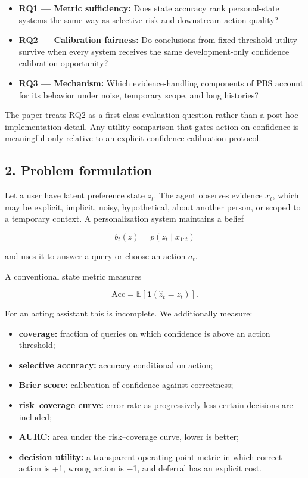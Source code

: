 \begin{itemize}
\tightlist
\item
  \textbf{RQ1 --- Metric sufficiency:} Does state accuracy rank
  personal-state systems the same way as selective risk and downstream
  action quality?
\item
  \textbf{RQ2 --- Calibration fairness:} Do conclusions from
  fixed-threshold utility survive when every system receives the same
  development-only confidence calibration opportunity?
\item
  \textbf{RQ3 --- Mechanism:} Which evidence-handling components of PBS
  account for its behavior under noise, temporary scope, and long
  histories?
\end{itemize}

The paper treats RQ2 as a first-class evaluation question rather than a
post-hoc implementation detail. Any utility comparison that gates action
on confidence is meaningful only relative to an explicit confidence
calibration protocol.

\subsection{2. Problem formulation}\label{problem-formulation}

Let a user have latent preference state \(z_t\). The agent observes
evidence \(x_t\), which may be explicit, implicit, noisy, hypothetical,
about another person, or scoped to a temporary context. A
personalization system maintains a belief

\[
b_t(z)=p(z_t\mid x_{1:t})
\]

and uses it to answer a query or choose an action \(a_t\).

A conventional state metric measures

\[
\mathrm{Acc}=\mathbb{E}[\mathbf{1}(\hat z_t=z_t)].
\]

For an acting assistant this is incomplete. We additionally measure:

\begin{itemize}
\tightlist
\item
  \textbf{coverage:} fraction of queries on which confidence is above an
  action threshold;
\item
  \textbf{selective accuracy:} accuracy conditional on action;
\item
  \textbf{Brier score:} calibration of confidence against correctness;
\item
  \textbf{risk--coverage curve:} error rate as progressively
  less-certain decisions are included;
\item
  \textbf{AURC:} area under the risk--coverage curve, lower is better;
\item
  \textbf{decision utility:} a transparent operating-point metric in
  which correct action is +1, wrong action is −1, and deferral has an
  explicit cost.
\end{itemize}

